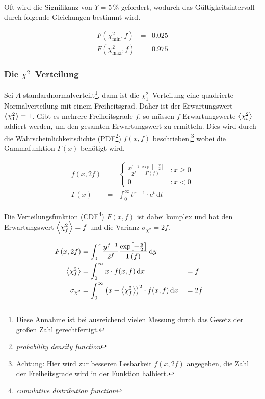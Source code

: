\documentclass[12pt,a4paper]{scrartcl}
\numberwithin{equation}{section} %
\renewcommand{\[}{} %
\renewcommand{\]}{\noindent} %
\begin{document}
Oft wird die Signifikanz von \(Y=5\,\%\) gefordert, wodurch das
Gültigkeitsintervall durch folgende Gleichungen bestimmt wird.

\[
\begin{eqnarray}
    F(\chi^2_\mathrm{min}, f) &=& 0.025 \label{eq:ChiMinFormula} \\
    F(\chi^2_\mathrm{max}, f) &=& 0.975 \label{eq:ChiMaxFormula}
\end{eqnarray}
\]

\hypertarget{die-chi2verteilung}{%
\subsubsection{\texorpdfstring{Die
\(\chi^2\)--Verteilung}{Die \textbackslash chi\^{}2--Verteilung}}\label{die-chi2verteilung}}

Sei \(A\) standardnormalverteilt\footnote{Diese Annahme ist bei
  ausreichend vielen Messung durch das Gesetz der großen Zahl
  gerechtfertigt.}, dann ist die \(\chi_1^2\)--Verteilung eine
quadrierte Normalverteilung mit einem Freiheitsgrad. Daher ist der
Erwartungswert \(\expval{\chi_1^2}=1\). Gibt es mehrere Freiheitsgrade
\(f\), so müssen \(f\) Erwartungswerte \(\expval{\chi_i^2}\) addiert
werden, um den gesamten Erwartungswert zu ermitteln. Dies wird durch die
Wahrscheinlichkeitsdichte (PDF\footnote{\emph{probability density
  function}}) \(f(x, f)\) beschrieben,\footnote{Achtung: Hier wird zur
  besseren Lesbarkeit \(f(x, 2f)\) angegeben, die Zahl der
  Freiheitsgrade wird in der Funktion halbiert.} wobei die Gammafunktion
\(\Gamma(x)\) benötigt wird.

\[
\begin{eqnarray}
    f(x, 2f) &=&
        \begin{cases}
                \frac{x^{f-1}}{2^f}
                    \frac{\exp[-\frac{x}{2}]}{\Gamma(f)}
                    & : x\ge 0 \\
                0 & : x < 0
        \end{cases} \\
    \Gamma(x) &=& \int_0^\infty t^{x-1}\cdot \mathrm e^t \,\mathrm dt
\end{eqnarray}
\]

Die Verteilungsfunktion (CDF\footnote{\emph{cumulative distribution
  function}}) \(F(x, f)\) ist dabei komplex und hat den Erwartungswert
\(\expval{\chi_f^2}=f\) und die Varianz \(\sigma_{\chi^2}=2f\).

\[
\begin{align}
    F(x, 2f) &=
        \int_0^x
            \frac{y^{f-1}}{2^f}
                \frac{\exp[-\frac{y}{2}]}{\Gamma(f)}
            \,\mathrm dy \\
    \expval{\chi_f^2} &=
        \int_0^\infty x\cdot f(x, f)
            \,\mathrm dx
        &&= f \\
    \sigma_{\chi^2} &=
        \int_0^\infty \left(x - \expval{\chi_f^2}\right)^2 \cdot f(x, f)
            \,\mathrm dx
         &&=2f
\end{align}
\]
\end{document}
